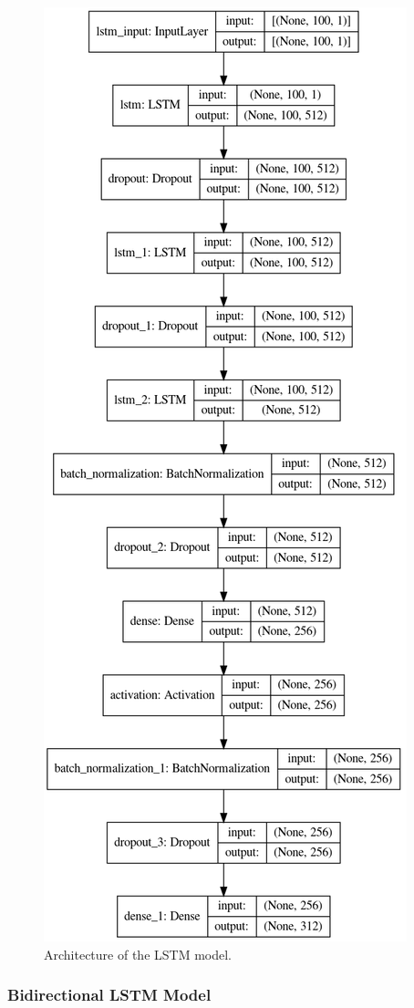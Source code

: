 \documentclass[sigconf,authorversion]{acmart}
\begin{document}
\begin{figure}[h]
  \centering
  \includegraphics[width=0.7\linewidth]{lstm_model.png}
  \caption{Architecture of the LSTM model.}
  \label{lstm_model}
\end{figure}

\subsubsection{Bidirectional LSTM Model}
\end{document}
